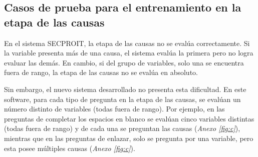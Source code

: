 \subsection{Casos de prueba para el entrenamiento en la etapa de las causas}
En el sistema SECPROIT, la etapa de las causas no se evalúa correctamente. Si la variable presenta más de una causa, el sistema evalúa la primera pero no logra evaluar las demás. En cambio, si del grupo de variables, solo una se encuentra fuera de rango, la etapa de las causas no se evalúa en absoluto.

Sin embargo, el nuevo sistema desarrollado no presenta esta dificultad. En este software, para cada tipo de pregunta en la etapa de las causas, se evalúan un número distinto de variables (todas fuera de rango). Por ejemplo, en las preguntas de completar los espacios en blanco se evalúan cinco variables distintas (todas fuera de rango) y de cada una se preguntan las causas (\textsl{Anexo \ref{fig:c}}), mientras que en las preguntas de enlazar, solo se pregunta por una variable, pero esta posee múltiples causas (\textsl{Anexo \ref{fig:c}}).
